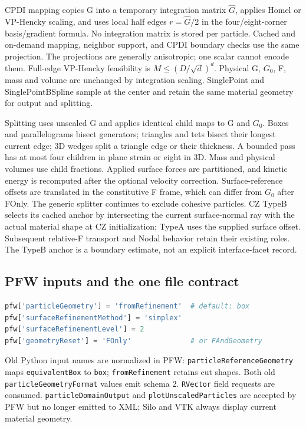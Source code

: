 CPDI mapping copies G into a temporary integration matrix $\widehat G$, applies
Homel or VP-Hencky scaling, and uses local half edges $r=\widehat G/2$ in the
four/eight-corner basis/gradient formula. No integration matrix is stored per
particle. Cached and on-demand mapping, neighbor support, and CPDI boundary
checks use the same projection. The projections are generally anisotropic;
one scalar cannot encode them. Full-edge VP-Hencky feasibility is
$M\leq(D/\sqrt d)^d$. Physical G, $G_0$, F, mass and volume are unchanged by
integration scaling. SinglePoint and SinglePointBSpline sample at the center
and retain the same material geometry for output and splitting.

Splitting uses unscaled G and applies identical child maps to G and $G_0$.
Boxes and parallelograms bisect generators; triangles and tets bisect their
longest current edge; 3D wedges split a triangle edge or their thickness. A bounded pass has at most four
children in plane strain or eight in 3D. Mass and physical volumes use child
fractions. Applied surface forces are partitioned, and kinetic energy is
recomputed after the optional velocity correction. Surface-reference offsets
are translated in the constitutive F frame, which can differ from $G_0$ after
FOnly. The generic splitter continues to exclude cohesive particles. CZ TypeB selects its cached
anchor by intersecting the current surface-normal ray with the actual material
shape at CZ initialization; TypeA uses the supplied surface offset. Subsequent
relative-F transport and Nodal behavior retain their existing roles. The
TypeB anchor is a boundary estimate, not an explicit interface-facet record.

\subsection{PFW inputs and the one file contract}
\begin{lstlisting}[language=Python]
pfw['particleGeometry'] = 'fromRefinement'  # default: box
pfw['surfaceRefinementMethod'] = 'simplex'
pfw['surfaceRefinementLevel'] = 2
pfw['geometryReset'] = 'FOnly'              # or FAndGeometry
\end{lstlisting}
Old Python input names are normalized in PFW: \texttt{particleReferenceGeometry}
maps \texttt{equivalentBox} to \texttt{box}; \texttt{fromRefinement} retains cut
shapes. Both old \texttt{particleGeometryFormat} values emit schema 2.
\texttt{RVector} field requests are consumed. \texttt{particleDomainOutput} and
\texttt{plotUnscaledParticles} are accepted by PFW but no longer emitted to XML;
Silo and VTK always display current material geometry.

